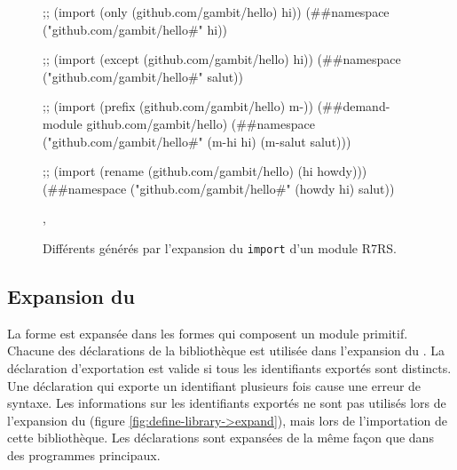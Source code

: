 \begin{figure}[ht]
  \centering
\vspace*{3ex}
  \fontsize{12}{10}
  \begin{mplisting}{1}
;; (import (only (github.com/gambit/hello) hi))
(##namespace ("github.com/gambit/hello#" hi))

;; (import (except (github.com/gambit/hello) hi))
(##namespace ("github.com/gambit/hello#" salut))

;; (import (prefix (github.com/gambit/hello) m-))
(##demand-module github.com/gambit/hello)
(##namespace ("github.com/gambit/hello#" (m-hi hi) (m-salut salut)))

;; (import (rename (github.com/gambit/hello) (hi howdy)))
(##namespace ("github.com/gambit/hello#" (howdy hi) salut))
\end{mplisting}
  \caption{Différents  générés par
    l'expansion du \texttt{import} d'un module R7RS.}
  \label{fig:import->expand-r7rs-namespace},
\end{figure}


\subsection{Expansion du }

La forme  est expansée dans les formes qui composent un
module primitif. Chacune des déclarations de la bibliothèque est utilisée dans
l'expansion du . La déclaration d'exportation est
valide si tous les identifiants exportés sont distincts. Une déclaration
 qui exporte un identifiant plusieurs fois cause une erreur de
syntaxe. Les informations sur les identifiants exportés ne sont pas utilisés
lors de l'expansion du
 (figure \ref{fig:define-library->expand}), mais lors de
l'importation de cette bibliothèque.  Les déclarations  sont
expansées de la même façon que dans des programmes principaux.\\[3ex]

